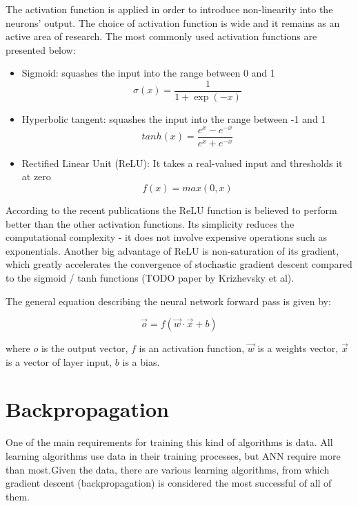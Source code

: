The activation function is applied in order to introduce non-linearity into the neurons' output. The choice of activation function is wide and it remains as an active area of research. The most commonly used activation functions are presented below: 

\begin{itemize}
\itemsep0em 
\item Sigmoid: squashes the input into the range between 0 and 1 
\begin{equation}
\sigma (x) = \frac{1}{1+\exp(-x)} 
\end{equation}
\item Hyperbolic tangent: squashes the input into the range between -1 and 1
\begin{equation}
tanh(x) = \frac{e^{x} - e^{-x}}{e^{x} + e^{-x}}
\end{equation}
\item Rectified Linear Unit (ReLU): It takes a real-valued input and thresholds it at zero
\begin{equation}
f(x) = max(0, x)
\end{equation}
\end{itemize}

According to the recent publications the ReLU function is believed to perform better than the other activation functions. Its simplicity reduces the computational complexity - it does not involve expensive operations such as exponentials. Another big advantage of ReLU is non-saturation of its gradient, which greatly accelerates the convergence of stochastic gradient descent compared to the sigmoid / tanh functions (TODO paper by Krizhevsky et 
al).

The general equation describing the neural network forward pass is given by:

\begin{equation}
\vec{o} = f(\vec{w} \cdot \vec{x} + b) 
\end{equation}

where $o$ is the output vector, $f$ is an activation function, $\vec{w}$ is a weights vector, $\vec{x}$ is a vector of layer input, $b$ is a bias.

\section{Backpropagation}

One of the main requirements for training this kind of algorithms is data. All learning algorithms use data in their training processes, but ANN require more than most.Given the data, there are various learning algorithms, from which gradient descent (backpropagation) is considered the most successful of all of them.


